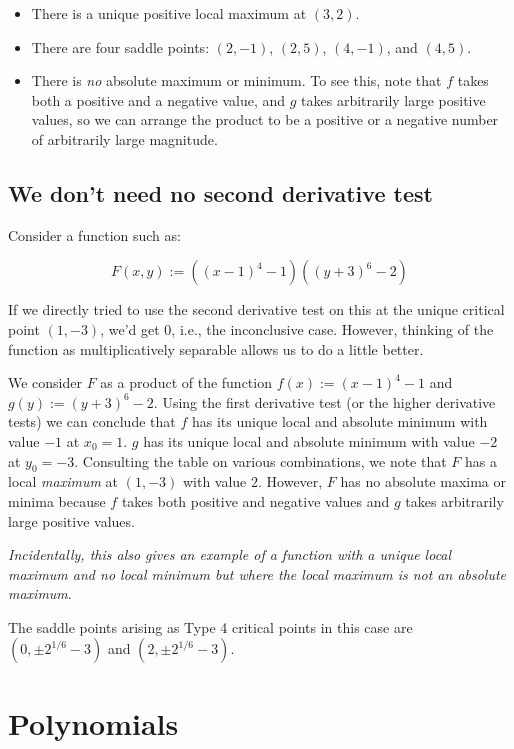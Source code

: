 \documentclass[10pt]{amsart}
\begin{document}
\begin{itemize}
\item There is a unique positive local maximum at $(3,2)$.
\item There are four saddle points: $(2,-1)$, $(2,5)$, $(4,-1)$, and
  $(4,5)$.
\item There is {\em no} absolute maximum or minimum. To see this, note
  that $f$ takes both a positive and a negative value, and $g$ takes
  arbitrarily large positive values, so we can arrange the product to
  be a positive or a negative number of arbitrarily large magnitude.
\end{itemize}

\subsection{We don't need no second derivative test}

Consider a function such as:

$$F(x,y) := ((x-1)^4 - 1)((y+3)^6 - 2)$$

If we directly tried to use the second derivative test on this at the
unique critical point $(1,-3)$, we'd get $0$, i.e., the inconclusive
case. However, thinking of the function as multiplicatively separable
allows us to do a little better.

We consider $F$ as a product of the function $f(x) := (x - 1)^4 - 1$
and $g(y) := (y+3)^6 - 2$. Using the first derivative test (or the
higher derivative tests) we can conclude that $f$ has its unique local
and absolute minimum with value $-1$ at $x_0 = 1$. $g$ has its unique
local and absolute minimum with value $-2$ at $y_0 = -3$. Consulting
the table on various combinations, we note that $F$ has a local {\em
maximum} at $(1,-3)$ with value $2$. However, $F$ has no
absolute maxima or minima because $f$ takes both positive and negative
values and $g$ takes arbitrarily large positive values.

{\em Incidentally, this also gives an example of a function with a
unique local maximum and no local minimum but where the local maximum
is not an absolute maximum}.

The saddle points arising as Type 4 critical points in this case are
$(0,\pm 2^{1/6} - 3)$ and $(2, \pm 2^{1/6} - 3)$.

\section{Polynomials}
\end{document}
